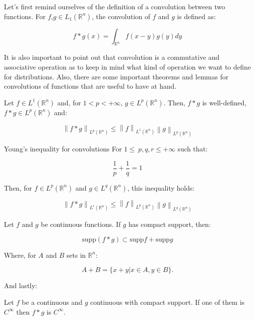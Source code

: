 Let's first remind ourselves of the definition of a convolution between two functions. For $f$,$g\in L_1(\mathbb{R}^n)$, the convolution of $f$ and $g$ is defined as:

\[f\ast g(x) = \int_{\mathbb{R}^n} f(x-y)g(y)dy\]

It is also important to point out that convolution is a commutative and associative operation as to keep in mind what kind of operation we want to define for distributions. Also, there are some important theorems and lemmas for convolutions of functions that are useful to have at hand.

\begin{theorem}{}{}
    Let $f\in L^1(\mathbb{R}^n)$ and, for $1<p<+\infty$, $g\in L^p(\mathbb{R}^n)$. Then, $f\ast g$ is well-defined, $f\ast g\in L^p(\mathbb{R}^n)$ and:

    \[\left\lVert f\ast g\right\rVert_{L^p(\mathbb{R}^n)}\leq\left\lVert f\right\rVert_{L^1(\mathbb{R}^n)}\left\lVert g\right\rVert_{L^p(\mathbb{R}^n)}\]
    
\end{theorem}

\begin{lemma}{Young's inequality for convolutions}{}
    For $1\leq\ p,q,r\leq +\infty$ such that:

    \[\frac{1}{p} + \frac{1}{q} = 1\]

    Then, for $f\in L^p(\mathbb{R}^n)$ and $g\in L^q(\mathbb{R}^n)$, this inequality holds: 

     \[\left\lVert f\ast g\right\rVert_{L^r(\mathbb{R}^n)}\leq\left\lVert f\right\rVert_{L^p(\mathbb{R}^n)}\left\lVert g\right\rVert_{L^q(\mathbb{R}^n)}\]

\end{lemma}

\begin{theorem}{}{}
    Let $f$ and $g$ be continuous functions. If $g$ has compact support, then:

    \[\text{supp}(f\ast g)\subset\text{supp}f + \text{supp}g\]

    Where, for $A$ and $B$ sets in $\mathbb{R}^n$:

    \[A+B=\{x+y|x\in A, y\in B\}.\]
    
\end{theorem}

And lastly:

\begin{theorem}{}{}
    Let $f$ be a continuous and $g$ continuous with compact support. If one of them is $C^\infty$ then $f\ast g$ is $C^\infty$.
\end{theorem}

